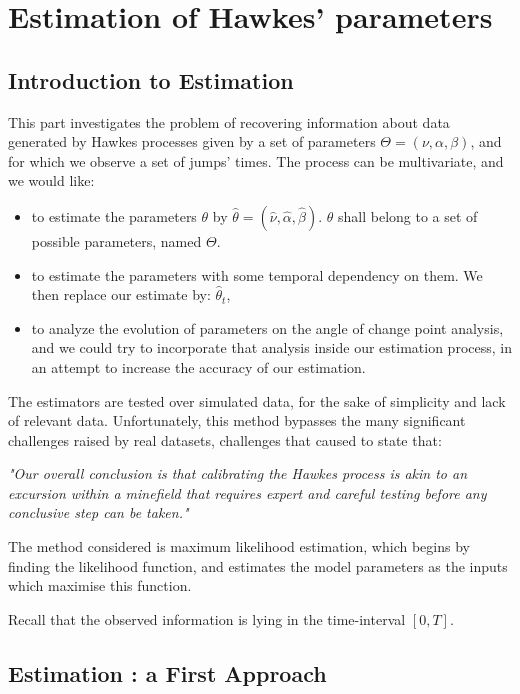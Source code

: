 \part{Estimation of Hawkes' parameters}
\chapter{Introduction to Estimation}

This part investigates the problem of recovering information about data generated by Hawkes processes given by a set of parameters $\Theta = ( \nu, \alpha, \beta ) $, and for which we observe a set of jumps' times. The process can be multivariate, and we would like:

\begin{itemize}
\item to estimate the parameters $\theta$ by $\hat{\theta} = ( \hat{\nu}, \hat{\alpha}, \hat{\beta} )$. $\theta$ shall belong to a set of possible parameters, named $\Theta$.

\item to estimate the parameters with some temporal dependency on them. We then replace our estimate by: $\hat{\theta}_t$,
\item to analyze the evolution of parameters on the angle of change point analysis, and we could try to incorporate that analysis inside our estimation process, in an attempt to increase the accuracy of our estimation.
\end{itemize}


The estimators are tested over simulated data, for the sake of simplicity and lack of relevant data. Unfortunately, this method bypasses the many significant challenges raised by real datasets, challenges that caused \cite{critic_hawkes} to state that:

\textit{"Our overall conclusion is that calibrating the Hawkes process is akin to an excursion within a minefield that requires expert and careful testing before any conclusive step can be taken."}

The method considered is maximum likelihood estimation, which begins by finding the likelihood function, and estimates the model parameters as the inputs which maximise this function.

Recall that the observed information is lying in the time-interval $[0,T]$.
\chapter{Estimation : a First Approach}

